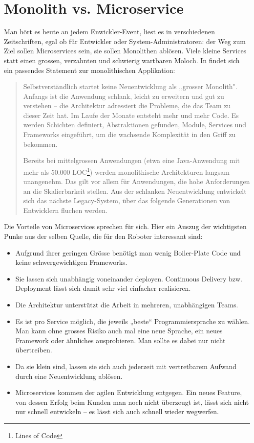 \section{Monolith vs. Microservice}
Man hört es heute an jedem Enwickler-Event, liest es in verschiedenen Zeitschriften, egal ob für Entwickler oder System-Administratoren: der Weg zum Ziel sollen Microservices sein, sie sollen Monolithen ablösen. Viele kleine Services statt einen grossen, verzahnten und schwierig wartbaren Moloch.
In \cite{informatik-aktuell-microservices} findet sich ein passendes Statement zur monolithischen Applikation:
\begin{quote}
	Selbstverständlich startet keine Neuentwicklung als ,,grosser Monolith". Anfangs ist die Anwendung schlank, leicht zu erweitern und gut zu verstehen – die Architektur adressiert die Probleme, die das Team zu dieser Zeit hat. Im Laufe der Monate entsteht mehr und mehr Code. Es werden Schichten definiert, Abstraktionen gefunden, Module, Services und Frameworks eingeführt, um die wachsende Komplexität in den Griff zu bekommen.
	
	Bereits bei mittelgrossen Anwendungen (etwa eine Java-Anwendung mit mehr als 50.000 LOC\footnote{Lines of Code}) werden monolithische Architekturen langsam unangenehm. Das gilt vor allem für Anwendungen, die hohe Anforderungen an die Skalierbarkeit stellen. Aus der schlanken Neuentwicklung entwickelt sich das nächste Legacy-System, über das folgende Generationen von Entwicklern fluchen werden.
\end{quote}
Die Vorteile von Microservices sprechen für sich. Hier ein Auszug der wichtigsten Punke aus der selben Quelle\cite{informatik-aktuell-microservices}, die für den Roboter interessant sind:
\begin{itemize}
	\item
Aufgrund ihrer geringen Grösse benötigt man wenig Boiler-Plate Code und keine schwergewichtigen Frameworks.
	\item
Sie lassen sich unabhängig voneinander deployen. Continuous Delivery bzw. Deployment lässt sich damit sehr viel einfacher realisieren.
	\item
Die Architektur unterstützt die Arbeit in mehreren, unabhängigen Teams.
	\item
Es ist pro Service möglich, die jeweils „beste“ Programmiersprache zu wählen. Man kann ohne grosses Risiko auch mal eine neue Sprache, ein neues Framework oder ähnliches ausprobieren. Man sollte es dabei nur nicht übertreiben.
	\item
Da sie klein sind, lassen sie sich auch jederzeit mit vertretbarem Aufwand durch eine Neuentwicklung ablösen.
	\item
Microservices kommen der agilen Entwicklung entgegen. Ein neues Feature, von dessen Erfolg beim Kunden man noch nicht überzeugt ist, lässt sich nicht nur schnell entwickeln – es lässt sich auch schnell wieder wegwerfen.
\end{itemize}


